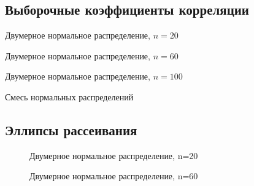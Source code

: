 \subsection {Выборочные коэффициенты корреляции}
	\begin{table}[H]
		\label{tabular:timesandtenses}
		\begin{center}
			
		\end{center}
		\caption{Двумерное нормальное распределение, $n=20$}
	\end{table}

	\begin{table}[H]
		\label{tabular:timesandtenses}
		\begin{center}
			
		\end{center}
		\caption{Двумерное нормальное распределение, $n=60$}
	\end{table}

	\begin{table}[H]
		\label{tabular:timesandtenses}
		\begin{center}
			
		\end{center}
		\caption{Двумерное нормальное распределение, $n=100$}
	\end{table}

	\begin{table}[H]
		\label{tabular:timesandtenses}
		\begin{center}
			
			
			
		\end{center}
		\caption{Смесь нормальных распределений}
	\end{table}

\subsection {Эллипсы рассеивания}
	\begin{figure}[H]
		\caption{Двумерное нормальное распределение, n=20}
		\label{ris:image}
	\end{figure}

	\begin{figure}[H]
		\caption{Двумерное нормальное распределение, n=60}
		\label{ris:image}
	\end{figure}

